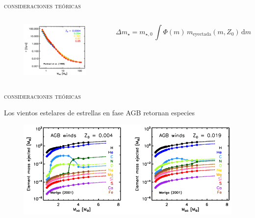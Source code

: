 \documentclass[xcolor=dvipsnames,4pt,hyperref={colorlinks,citecolor=black,linkcolor=black,urlcolor=black}]{beamer}
\begin{document}
\begin{frame}{\textsc{consideraciones teóricas}}

\begin{columns}
\begin{figure}
\includegraphics[scale=1]{img/yates2013-1}
\end{figure}
$$ \Delta m_\star = m_{\star,0}\,\int\Phi(m)\,m_\text{eyectada}(m,Z_0)\,\text{d}m $$
\end{columns}
\end{frame}

\begin{frame}{\textsc{consideraciones teóricas}}

Los vientos estelares de estrellas en fase AGB retornan especies
\begin{figure}
\includegraphics[scale=1]{img/yates2013-2}
\end{figure}
\end{frame}
\end{document}
